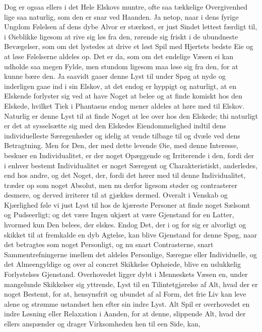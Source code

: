 \documentclass[12pt,a4paper]{book}
\newcommand{\apage}[1]{\marginnote{\footnotesize\textit{[#1]}}}
\begin{document}
\apage{51} Dog er ogsaa ellers i det Hele Elskovs muntre, ofte saa tækkelige
Overgivenhed lige saa naturlig, som den er snar ved Haanden. Ja netop,
naar i dens fyrige Ungdom Følelsen af dens dybe Alvor er stærkest, er
just Sindet lettest færdigt til, i Øieblikke ligesom at rive sig løs fra
den, rørende sig friskt i de ubundneste Bevægelser, som om det lystedes
at drive et løst Spil med Hjertets bedste Eie og at løse Følelserne
aldeles op. Det er da, som om det endelige Væsen ei kan udholde saa
megen Fylde, men stundom ligesom maa løse sig fra den, for at kunne bære
den. Ja saavidt gaaer denne Lyst til under Spøg at nyde og inderligen
gaae ind i sin Elskov, at det endog er hyppigt og naturligt, at en
Elskende forlyster sig ved at have Noget at belee og at finde komiskt
hos den Elskede, hvilket Tiek i Phantasus endog mener aldeles at høre
med til Elskov. Naturlig er denne Lyst til at finde Noget at lee over
hos den Elskede; thi naturligt er det at sysselsætte sig med den
Elskedes Eiendommelighed indtil dens individuelleste Særegenheder og
idelig at vende tilbage til og dvæle ved dens Betragtning. Men for Den,
der med dette levende Øie, med denne Interesse, beskuer en
Individualitet, er der noget Opæggende og Irriterende i den, fordi der i
enhver bestemt Individualitet er noget Særegent og Charakteristiskt,
anderledes, end hos andre, og det Noget, der, fordi det hører med til
denne Individualitet, træder op som noget Absolut, men nu derfor ligesom
støder og contrasterer \apage{52} desmere, og derved irriterer til at gjækkes
dermed.%
 Overalt i Venskab og Kjærlighed føle vi just Lyst til hos de
kjæreste Personer at finde noget Sælsomt og Pudseerligt; og det være
Ingen ukjært at være Gjenstand for en Latter, hvormed kun Den belees,
der elskes. Endog Det, der i og for sig er alvorligt og skikket til at
fremkalde en dyb Agtelse, kan blive Gjenstand for denne Spøg, naar det
betragtes som noget Personligt, og nu snart Contrasterne, snart
Sammentrefningerne imellem det aldeles Personlige, Særegne eller
Individuelle, og det Almeengyldige og over al concret Skikkelse
Ophøiede, blive en uslukkelig Forlystelses Gjenstand. Overhovedet ligger
dybt i Menneskets Væsen en, under mangelunde Skikkelser sig yttrende,
Lyst til en Tilintetgjørelse af Alt, hvad der er noget Bestemt, for at,
hensynsfrit og ubundet af al Form, det frie Liv kan leve alene og
strømme ustandset hen efter sin indre Lyst. Alt Spil er overhovedet en
indre Løsning eller Relaxation i Aanden, for at denne, slippende Alt,
hvad der ellers anspænder og drager Virksomheden hen til een Side, kan,
\end{document}
